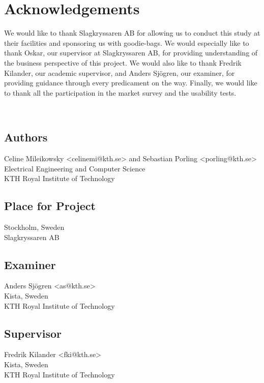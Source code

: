 \newpage
\section*{Acknowledgements}
We would like to thank Slagkryssaren AB for allowing us to conduct this study at their facilities and sponsoring us with goodie-bags. We would especially like to thank Oskar, our supervisor at Slagkryssaren AB, for providing understanding of the business perspective of this project. We would also like to thank Fredrik Kilander, our academic supervisor, and Anders Sjögren, our examiner, for providing guidance through every predicament on the way. Finally, we would like to thank all the participation in the market survey and the usability tests.






\newpage
\thispagestyle{empty}

~\\
\vfill
{ 
	\subsection*{Authors}
	Celine Mileikowsky <celinemi@kth.se> and Sebastian Porling <porling@kth.se>\\
	Electrical Engineering and Computer Science\\
	KTH Royal Institute of Technology
	
	\subsection*{Place for Project}
	Stockholm, Sweden\\
	Slagkryssaren AB
	
	\subsection*{Examiner}
	Anders Sjögren <as@kth.se> \\
	Kista, Sweden\\
	KTH Royal Institute of Technology
	
	\subsection*{Supervisor }
	Fredrik Kilander <fki@kth.se>\\
	Kista, Sweden\\
	KTH Royal Institute of Technology
	~
	
}


